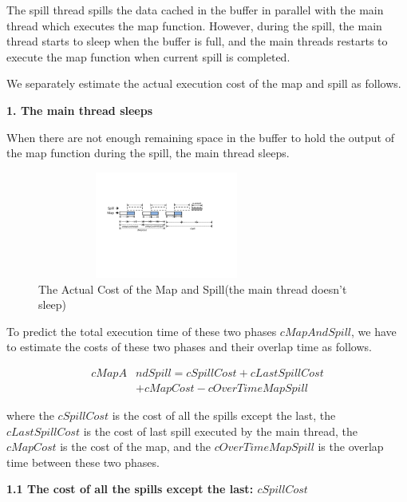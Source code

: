 The spill thread spills the data cached in the buffer in parallel with the main thread which executes the map function. However, during the spill, the main thread starts to sleep when the buffer is full, and the main threads restarts to execute the map function when current spill is completed.

We separately estimate the actual execution cost of the map and spill as follows.

\noindent\textbf{1. The main thread sleeps}

When there are not enough remaining space in the buffer to hold the output of the map function during the spill, the main thread sleeps.
\begin{figure}[htbp]
\centering
\includegraphics[height=3.5cm, width=8.5cm]{model1}
\caption{The Actual Cost of the Map and Spill(the main thread doesn't sleep)}
\label{fig:act}
\end{figure}

To predict the total execution time of these two phases $cMapAndSpill$, we have to estimate the costs of these two phases and their overlap time as follows.
\begin{small}
\begin{equation}
\begin{split}
cMapA&ndSpill=cSpillCost+cLastSpillCost \\
&+cMapCost-cOverTimeMapSpill
\end{split}
\end{equation}
\end{small}
where the $cSpillCost$ is the cost of all the spills except the last, the $cLastSpillCost$ is the cost of last spill executed by the main thread, the $cMapCost$ is the cost of the map, and the $cOverTimeMapSpill$ is the overlap time between these two phases.

\noindent\textbf{1.1 The cost of all the spills except the last: $cSpillCost$}

